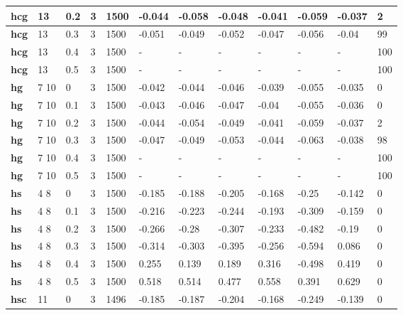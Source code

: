 \begin{longtable}[h]{|p{0.8cm}|p{1.5cm}|p{1cm}|p{1cm}|p{1cm}|p{1cm}|p{1cm}|p{1cm}|p{1cm}|p{1cm}|p{1cm}|p{1.5cm}|}
    \\ \hline
  \textbf{hcg } &  13         & 0.2 & 3 & 1500 & -0.044 & -0.058 & -0.048 & -0.041 & -0.059 & -0.037 &   2
    \\ \hline
  \textbf{hcg } &  13         & 0.3 & 3 & 1500 & -0.051 & -0.049 & -0.052 & -0.047 & -0.056 &  -0.04 &  99
    \\ \hline
  \textbf{hcg } &  13         & 0.4 & 3 & 1500 & - & - & - & - & - & - & 100
    \\ \hline
  \textbf{hcg } &  13         & 0.5 & 3 & 1500 & - & - & - & - & - & - & 100
    \\ \hline
  \textbf{hg  } &  7 10       &   0 & 3 & 1500 & -0.042 & -0.044 & -0.046 & -0.039 & -0.055 & -0.035 &   0
    \\ \hline
  \textbf{hg  } &  7 10       & 0.1 & 3 & 1500 & -0.043 & -0.046 & -0.047 &  -0.04 & -0.055 & -0.036 &   0
    \\ \hline
  \textbf{hg  } &  7 10       & 0.2 & 3 & 1500 & -0.044 & -0.054 & -0.049 & -0.041 & -0.059 & -0.037 &   2
    \\ \hline
  \textbf{hg  } &  7 10       & 0.3 & 3 & 1500 & -0.047 & -0.049 & -0.053 & -0.044 & -0.063 & -0.038 &  98
    \\ \hline
  \textbf{hg  } &  7 10       & 0.4 & 3 & 1500 & - & - & - & - & - & - & 100
    \\ \hline
  \textbf{hg  } &  7 10       & 0.5 & 3 & 1500 & - & - & - & - & - & - & 100
    \\ \hline
  \textbf{hs  } &  4 8        &   0 & 3 & 1500 & -0.185 & -0.188 & -0.205 & -0.168 &  -0.25 & -0.142 &   0
    \\ \hline
  \textbf{hs  } &  4 8        & 0.1 & 3 & 1500 & -0.216 & -0.223 & -0.244 & -0.193 & -0.309 & -0.159 &   0
    \\ \hline
  \textbf{hs  } &  4 8        & 0.2 & 3 & 1500 & -0.266 &  -0.28 & -0.307 & -0.233 & -0.482 &  -0.19 &   0
    \\ \hline
  \textbf{hs  } &  4 8        & 0.3 & 3 & 1500 & -0.314 & -0.303 & -0.395 & -0.256 & -0.594 &  0.086 &   0
    \\ \hline
  \textbf{hs  } &  4 8        & 0.4 & 3 & 1500 &  0.255 &  0.139 &  0.189 &  0.316 & -0.498 &  0.419 &   0
    \\ \hline
  \textbf{hs  } &  4 8        & 0.5 & 3 & 1500 &  0.518 &  0.514 &  0.477 &  0.558 &  0.391 &  0.629 &   0
    \\ \hline
  \textbf{hsc } &  11         &   0 & 3 & 1496 & -0.185 & -0.187 & -0.204 & -0.168 & -0.249 & -0.139 &   0

\end{longtable}
